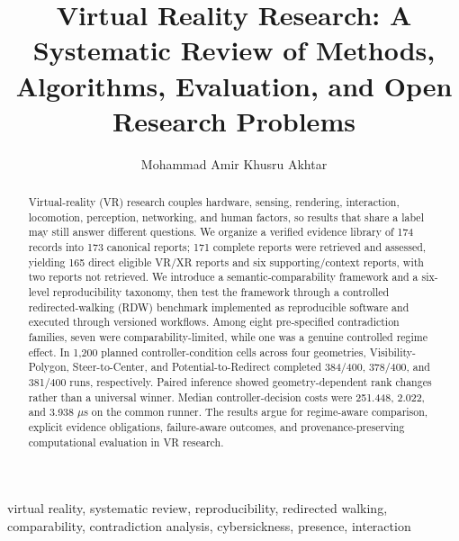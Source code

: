 \documentclass[journal]{IEEEtran}
\title{Virtual Reality Research: A Systematic Review of Methods, Algorithms, Evaluation, and Open Research Problems}
\author{Mohammad Amir Khusru Akhtar\\
\IEEEauthorblockA{Faculty of Computing and Information Technology, Usha Martin University, Ranchi, India\\
Email: amir@umu.ac.in}}
\begin{document}
\maketitle
\begin{abstract}
Virtual-reality (VR) research couples hardware, sensing, rendering, interaction, locomotion, perception, networking, and human factors, so results that share a label may still answer different questions. We organize a verified evidence library of 174 records into 173 canonical reports; 171 complete reports were retrieved and assessed, yielding 165 direct eligible VR/XR reports and six supporting/context reports, with two reports not retrieved. We introduce a semantic-comparability framework and a six-level reproducibility taxonomy, then test the framework through a controlled redirected-walking (RDW) benchmark implemented as reproducible software and executed through versioned workflows. Among eight pre-specified contradiction families, seven were comparability-limited, while one was a genuine controlled regime effect. In 1,200 planned controller-condition cells across four geometries, Visibility-Polygon, Steer-to-Center, and Potential-to-Redirect completed 384/400, 378/400, and 381/400 runs, respectively. Paired inference showed geometry-dependent rank changes rather than a universal winner. Median controller-decision costs were 251.448, 2.022, and 3.938 $\mu$s on the common runner. The results argue for regime-aware comparison, explicit evidence obligations, failure-aware outcomes, and provenance-preserving computational evaluation in VR research.
\end{abstract}
\begin{IEEEkeywords}
virtual reality, systematic review, reproducibility, redirected walking, comparability, contradiction analysis, cybersickness, presence, interaction
\end{IEEEkeywords}




\balance

\end{document}
